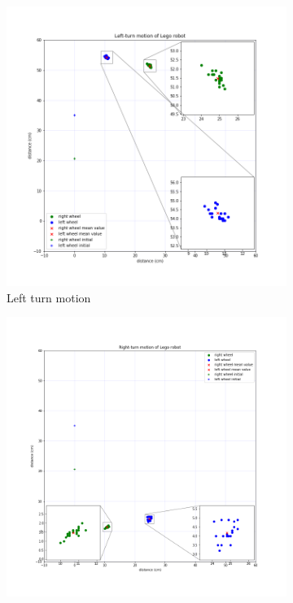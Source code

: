 \documentclass[11pt,a4paper,openright,twoside]{extreport}
\begin{document}
\begin{itemize}
\begin{figure}[H]
\centering
\begin{subfigure}[b]{0.49\textwidth}
\includegraphics[width=\textwidth]{Left-turn.png}
\caption{Left turn motion}
\label{left}
\end{subfigure}
\begin{subfigure}[b]{0.49\textwidth}
\includegraphics[width=\textwidth]{Right-turn.png}

\end{subfigure}
\end{figure}
\end{itemize}
\end{document}

